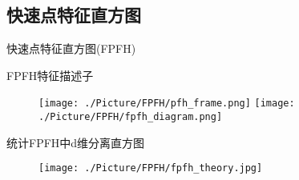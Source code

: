 \documentclass[xcolor=table,compress,blue]{beamer}
\begin{document}
  \subsection{快速点特征直方图}
  	\begin{frame}{快速点特征直方图(FPFH)}
  		\begin{exampleblock}{FPFH特征描述子}
  			\begin{figure}[htpb]
	  			\centering
  				\texttt{[image: ./Picture/FPFH/pfh\_frame.png]}
  				\texttt{[image: ./Picture/FPFH/fpfh\_diagram.png]}
  			\end{figure}
  		\end{exampleblock}
  		\begin{exampleblock}{统计FPFH中d维分离直方图}
  			\begin{figure}[htpb]
			 	\centering
			 	\texttt{[image: ./Picture/FPFH/fpfh\_theory.jpg]}
		 	\end{figure}
  		\end{exampleblock}
  	
  	
	\end{frame}
\end{document}
